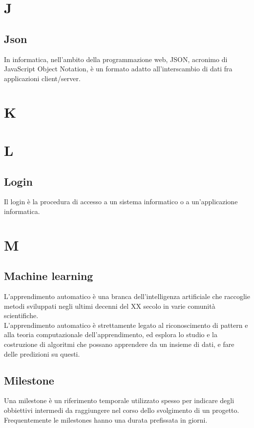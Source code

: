 \newpage
\section{J}
\subsection{Json}
In informatica, nell'ambito della programmazione web, JSON, acronimo di JavaScript Object Notation, è un formato adatto all'interscambio di dati fra applicazioni client/server.

\newpage
\section{K}

\newpage
\section{L}
\subsection{Login}
Il login è la procedura di accesso a un sistema informatico o a un'applicazione informatica.

\newpage
\section{M}
\subsection{Machine learning}
L'apprendimento automatico è una branca dell'intelligenza artificiale che raccoglie metodi sviluppati negli ultimi decenni del XX secolo in varie comunità scientifiche.\\
L'apprendimento automatico è strettamente legato al riconoscimento di pattern e alla teoria computazionale dell'apprendimento, ed esplora lo studio e la costruzione di algoritmi che possano apprendere da un insieme di dati, e fare delle predizioni su questi.

\subsection{Milestone}
Una milestone è un riferimento temporale utilizzato spesso per indicare degli obbiettivi intermedi da raggiungere nel corso dello svolgimento di un progetto. Frequentemente le milestones hanno una durata prefissata in giorni.

